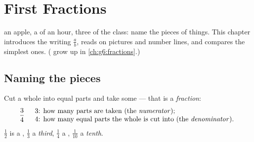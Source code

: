 \chapter{First Fractions}\label{ch:g4:fractions}

 an apple, a  of an hour, three  of the class:
 name the pieces of things. This chapter introduces the
writing $\frac{a}{b}$, reads  on pictures and number lines,
and compares the simplest ones. ( grow up in
\cref{ch:g6:fractions}.)

\section{Naming the pieces}

\begin{definition}[Fraction]\label{def:g4:fractions:def}
Cut a whole into equal parts and take some --- that is a
\emph{fraction}:
\[
\frac{3}{4}
\quad
\begin{array}{l}
3 \text{: how many parts are taken (the \emph{numerator}\index{numerator});}\\
4 \text{: how many equal parts the whole is cut into (the
\emph{denominator}\index{denominator}).}
\end{array}
\]
$\frac12$ is a \emph{}, $\frac13$ a \emph{third}, $\frac14$ a
\emph{}, $\frac{1}{10}$ a \emph{tenth}.
\end{definition}

